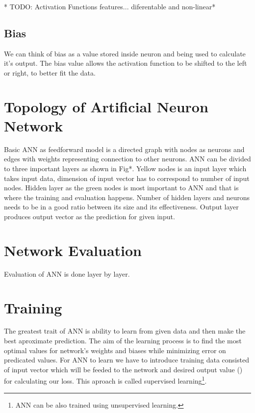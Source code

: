 * TODO: Activation Functions features... diferentable and non-linear*

\subsection{Bias}

We can think of bias as a value stored inside neuron and being used to calculate it's output.
The bias value allows the activation function to be shifted to the left or right, to better fit the data.


\section{Topology of Artificial Neuron Network}


Basic ANN as feedforward model is a directed graph with nodes as neurons and edges with weights representing connection to other neurons.
ANN can be divided to three important layers as shown in Fig*.
Yellow nodes is an input layer which takes input data, dimension of input vector has to correspond to number of input nodes.
Hidden layer as the green nodes is most important to ANN and that is where the training and evaluation happens.
Number of hidden layers and neurons needs to be in a good ratio between its size and its effectiveness.
Output layer produces output vector as the prediction for given input.


\section{Network Evaluation}

Evaluation of ANN is done layer by layer.


\section{Training}

The greatest trait of ANN is ability to learn from given data and then make the best aproximate prediction.
The aim of the learning process is to find the most optimal values for network's weights and biases while minimizing error on predicated values.
For ANN to learn we have to introduce training data consisted of input vector which will be feeded to the network and desired output value () for calculating our loss.
This aproach is called supervised learning\footnote{\label{note1}ANN can be also trained using unsupervised learning.}.
\newline

